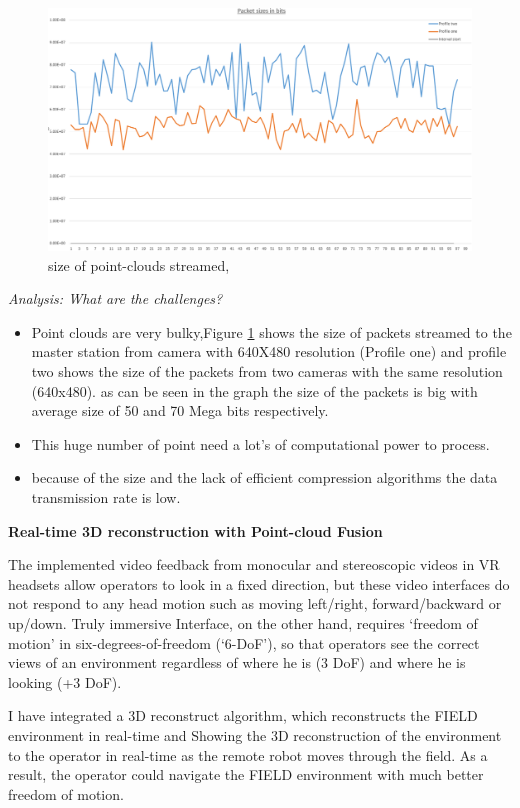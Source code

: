 \begin{figure}[h]
    \centering
    \includegraphics[scale=0.3]{images/wireshark_general.jpg}
    \caption{size of point-clouds streamed, }
    \label{fig:dataPipe}
\end{figure}

\textit{Analysis: What are the challenges?}
\begin{itemize}
    \item Point clouds are very bulky,Figure \ref{fig:dataPipe} shows the size of packets streamed to the master station from camera with 640X480 resolution (Profile one) and profile two shows the size of the packets from two cameras with the same resolution (640x480). as can be seen in the graph the size of the packets is big with average size of  50 and 70 Mega bits respectively.
    \item This huge number of point need a lot's of computational power to process.
    \item because of the size and the lack of efficient compression algorithms the data transmission rate is low.
\end{itemize}


\textbf{Real-time 3D reconstruction with Point-cloud Fusion}

The implemented video feedback from monocular and stereoscopic videos in VR headsets allow operators to look in a fixed direction, but these video interfaces do not respond to any head motion such as moving left/right, forward/backward or up/down. Truly immersive Interface, on the other hand, requires ‘freedom of motion’ in six-degrees-of-freedom (‘6-DoF’), so that operators see the correct views of an environment regardless of where he is (3 DoF) and where he is looking (+3 DoF).

I have integrated a 3D reconstruct algorithm, which reconstructs the FIELD environment in real-time and Showing the 3D reconstruction of the environment to the operator in real-time as the remote robot moves through the field. As a result, the operator could navigate the FIELD environment with much better freedom of motion.

